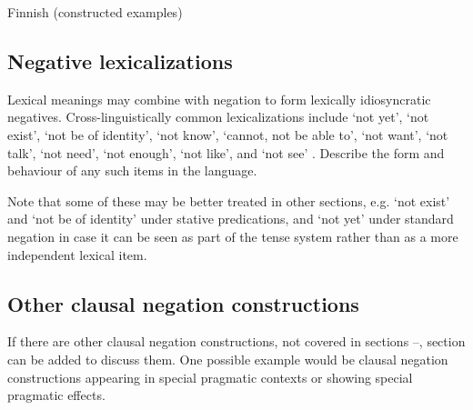 \documentclass[output=paper,colorlinks,citecolor=brown]{langscibook}
\begin{document}
\ea\label{ex:quest:4}Finnish (constructed examples)
    \z
\z 

\subsection{Negative lexicalizations}\label{sec:quest:2.5}

Lexical meanings may combine with negation to form lexically idiosyncratic negatives. Cross-linguistically common lexicalizations include ‘not yet’, ‘not exist’, ‘not be of identity', ‘not know', ‘cannot, not be able to', ‘not want', ‘not talk', ‘not need', ‘not enough', ‘not like', and ‘not see' \citep[cf.][]{Veselinova2013neg.exist}. Describe the form and behaviour of any such items in the language. 


Note that some of these may be better treated in other sections, e.g. ‘not exist’ and ‘not be of identity’ under stative predications, and ‘not yet’ under standard negation in case it can be seen as part of the tense system rather than as a more independent lexical item.

\subsection{Other clausal negation constructions}\label{sec:quest:2.6}

If there are other clausal negation constructions, not covered in sections --, section  can be added to discuss them. One possible example would be clausal negation constructions appearing in special pragmatic contexts or showing special pragmatic effects. 
\end{document}
